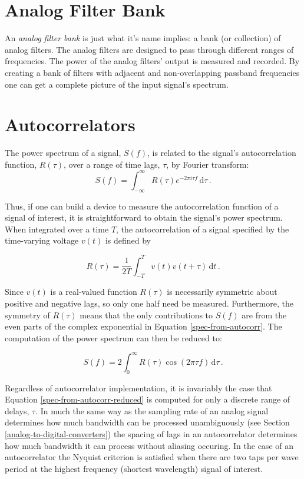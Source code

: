 \documentclass{article}
\begin{document}
\section{Analog Filter Bank}\label{analog-filter-bank}

An \emph{analog filter bank} is just what it's name implies: a bank (or
collection) of analog filters. The analog filters are designed to pass
through different ranges of frequencies. The power of the analog
filters' output is measured and recorded. By creating a bank of filters
with adjacent and non-overlapping passband frequencies one can get a
complete picture of the input signal's spectrum.

\section{Autocorrelators}\label{autocorrelators}
The power spectrum of a signal, $S(f)$,  is related to the signal's autocorrelation function, $R(\tau)$, over a range of time lags, $\tau$, by Fourier transform:
\begin{equation}
\label{spec-from-autocorr}
 S(f) = \int_{-\infty}^{\infty} R(\tau)e^{-2\pi i \tau f} \,\mathrm{d}\tau \,.
\end{equation}

Thus, if one can build a device to measure the autocorrelation function of a signal of interest, it is straightforward to obtain the signal's power spectrum.
When integrated over a time $T$, the autocorrelation of a signal specified by the time-varying voltage $v(t)$ is defined by 

\begin{equation}
\label{autocorr}
 R(\tau) = \frac{1}{2T} \int_{-T}^{T} v(t)v(t+\tau) \,\mathrm{d}t \,.
\end{equation}

Since $v(t)$ is a real-valued function $R(\tau)$ is necessarily symmetric about positive and negative lags, so only one half need be measured. Furthermore, the symmetry of $R(\tau)$ means that the only contributions to $S(f)$ are from the even parts of the complex exponential in Equation \ref{spec-from-autocorr}. The computation of the power spectrum can then be reduced to:

\begin{equation}
\label{spec-from-autocorr-reduced}
 S(f) = 2\int_{0}^{\infty} R(\tau)\cos{(2\pi \tau f)} \,\mathrm{d}\tau \,.
\end{equation}

Regardless of autocorrelator implementation, it is invariably the case that Equation \ref{spec-from-autocorr-reduced} is computed for only a discrete range of delays, $\tau$. In much the same way as the sampling rate of an analog signal determines how much bandwidth can be processed unambiguously (see Section \ref{analog-to-digital-converters}) the spacing of lags in an autocorrelator determines how much bandwidth it can process without aliasing occuring. In the case of an autocorrelator the Nyquist criterion is satisfied when there are two taps per wave period at the highest frequency (shortest wavelength) signal of interest. 
\end{document}

